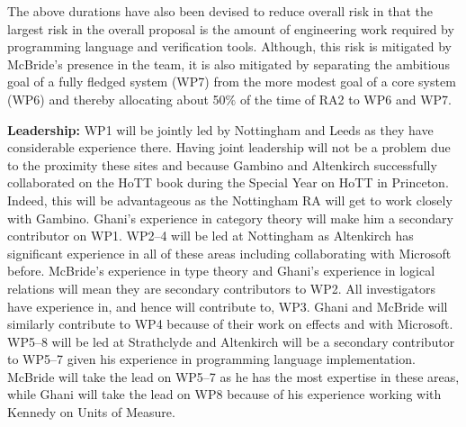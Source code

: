 \documentclass[a4paper,11pt]{article}
\begin{document}
The above durations have also been devised to reduce overall risk in
that the largest risk in the overall proposal is the amount of
engineering work required by programming language and verification
tools. Although, this risk is mitigated by McBride's presence in the
team, it is also mitigated by separating the ambitious goal of a fully
fledged system (WP7) from the more modest goal of a core system (WP6)
and thereby allocating about 50$\%$ of the time of RA2 to WP6 and
WP7.






{\bf Leadership:} WP1 will be jointly led by Nottingham and Leeds as
they have considerable experience there. Having joint leadership will
not be a problem due to the proximity these sites and because Gambino
and Altenkirch successfully collaborated on the HoTT book during the
Special Year on HoTT in Princeton. Indeed, this will be advantageous
as the Nottingham RA will get to work closely with Gambino. Ghani's
experience in category theory will make him a secondary contributor on
WP1. WP2--4 will be led at Nottingham as Altenkirch has significant
experience in all of these areas including collaborating with
Microsoft before. McBride's experience in type theory and Ghani's
experience in logical relations will mean they are secondary
contributors to WP2. All investigators have experience in, and hence
will contribute to, WP3. Ghani and McBride will similarly contribute
to WP4 because of their work on effects and with Microsoft. WP5--8
will be led at Strathclyde and Altenkirch will be a secondary
contributor to WP5--7 given his experience in programming language
implementation. McBride will take the lead on WP5--7 as he has the
most expertise in these areas, while Ghani will take the lead on WP8
because of his experience working with Kennedy on Units of Measure.
\end{document}
